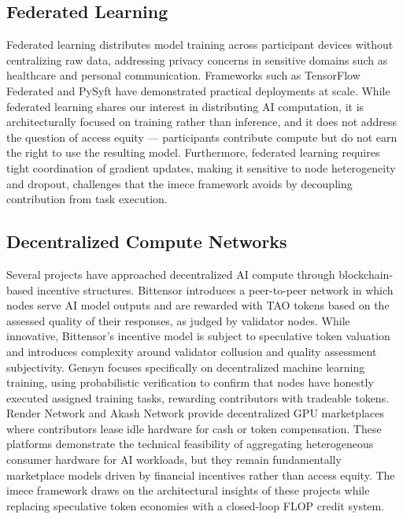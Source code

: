 \documentclass[12pt]{article}
\begin{document}
\subsection{Federated Learning}

Federated learning \cite{mcmahan2017federated} distributes model training across participant devices without centralizing raw data, addressing privacy concerns in sensitive domains such as healthcare and personal communication. Frameworks such as TensorFlow Federated \cite{tff2019} and PySyft \cite{pysyft2018} have demonstrated practical deployments at scale. While federated learning shares our interest in distributing AI computation, it is architecturally focused on training rather than inference, and it does not address the question of access equity — participants contribute compute but do not earn the right to use the resulting model. Furthermore, federated learning requires tight coordination of gradient updates, making it sensitive to node heterogeneity and dropout, challenges that the imece framework avoids by decoupling contribution from task execution.

\subsection{Decentralized Compute Networks}

Several projects have approached decentralized AI compute through blockchain-based incentive structures. Bittensor \cite{bittensor2022} introduces a peer-to-peer network in which nodes serve AI model outputs and are rewarded with TAO tokens based on the assessed quality of their responses, as judged by validator nodes. While innovative, Bittensor's incentive model is subject to speculative token valuation and introduces complexity around validator collusion and quality assessment subjectivity. Gensyn \cite{gensyn2022} focuses specifically on decentralized machine learning training, using probabilistic verification to confirm that nodes have honestly executed assigned training tasks, rewarding contributors with tradeable tokens. Render Network \cite{rendernetwork2020} and Akash Network \cite{akash2020} provide decentralized GPU marketplaces where contributors lease idle hardware for cash or token compensation. These platforms demonstrate the technical feasibility of aggregating heterogeneous consumer hardware for AI workloads, but they remain fundamentally marketplace models driven by financial incentives rather than access equity. The imece framework draws on the architectural insights of these projects while replacing speculative token economies with a closed-loop FLOP credit system.
\end{document}
